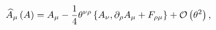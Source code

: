 \begin{equation}
\widehat{A}_{\mu}\left( A\right) =A_{\mu}-\frac{1}{4}\theta ^{\nu\rho}\left\{ A_{\nu},\partial
_{\rho}A_{\mu}+F_{\rho\mu}\right\} +{\cal O}\left( \theta ^{2}\right) ,  \label{asw}
\end{equation}


